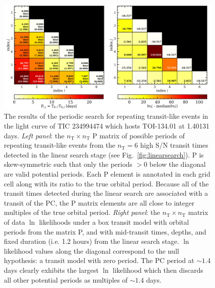\begin{figure}
  \centering
  \includegraphics[width=0.8\hsize]{figures/periodicsearch_234994474.png}
  \caption[Results of the periodic search for repeating transit-like events around TIC 234994474.]
          {The results of the periodic search for repeating transit-like events in the
    light curve of TIC 234994474 which hosts TOI-134.01 at 1.40131 days.
    \emph{Left panel}: the $n_{\text{T}} \times n_{\text{T}}$ P matrix of
    possible periods of repeating transit-like events from the $n_{\text{T}}=6$ high S/N transit
    times detected in the linear search stage (see Fig.~\ref{fig:linearsearch}).
    P is skew-symmetric such that only the periods $>0$ below the diagonal are valid potential
    periods. Each P element is annotated in
    each grid cell along with its ratio to the true orbital period.
    Because all of the transit times detected during the linear search
    are associated with a transit of the PC, the P matrix elements are all close to
    integer multiples of the true orbital period. \emph{Right panel}: the
    $n_{\text{T}} \times n_{\text{T}}$ matrix of data $\ln$ likelihoods under a box transit
    model with orbital periods from the matrix P, and with mid-transit times, depths, and
    fixed duration (i.e. 1.2 hours) from the linear search stage.
    $\ln$ likelihood values along the diagonal correspond to the null hypothesis: a transit
    model with zero period. The PC period at $\sim 1.4$ days clearly exhibits the largest
    $\ln$ likelihood which then discards all other potential periods as multiples of $\sim 1.4$ days.}
  \label{fig:periodicsearch}
\end{figure}

